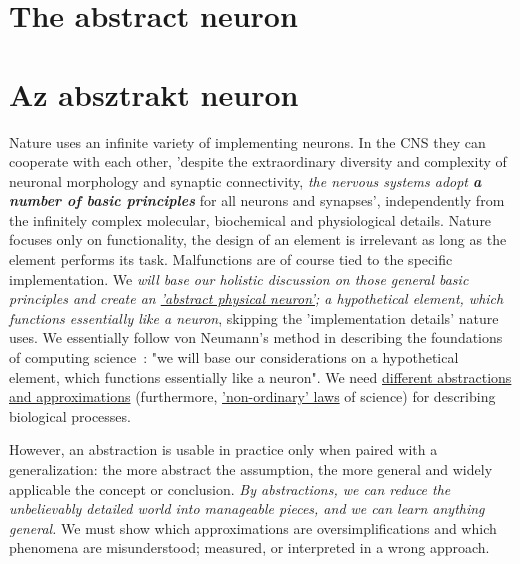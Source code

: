 
\ifx\magyar\undefined
\section[The abstract neuron]{The abstract neuron\label{sec:V2-0_AbstractNeuron}}

\else

\section[Az absztrakt neuron]{Az absztrakt neuron\label{sec:V2-0_AbstractNeuron}}
\fi


\ifx\magyar\undefined
Nature uses an infinite variety of implementing neurons. 
In the \gls{CNS} 
they can cooperate
with each other, 'despite the extraordinary diversity and complexity of neuronal morphology and synaptic connectivity,
\textit{the nervous systems adopt \textbf{a number of
 basic principles}} for all neurons and synapses',
\cite{JohnstonWuNeurophysiology:1995}
independently from the infinitely complex molecular, biochemical and physiological details.
Nature focuses only on functionality, the design of an element is irrelevant as long as the element performs its task. Malfunctions are of course tied to the specific implementation.
We \textit{will base our holistic discussion on those general basic principles 
and create an 
\hyperlink{NeuronPhysical}
{'abstract physical neuron'}; a hypothetical element, which functions
essentially like a neuron},
skipping the 'implementation details' nature uses.
We essentially follow von Neumann's method in describing the foundations of
computing science~\cite{EDVACreport1945}: "we will base our considerations on a hypothetical element, which functions essentially like a neuron".
We need \hyperlink{Abstractions}
{different abstractions and approximations} 
(furthermore, \hyperlink{NonOrdinaryLaws}{'non-ordinary' laws} of science) for describing biological processes.

However, an abstraction is usable
in practice only when paired with a generalization: the more abstract the assumption, the more general and widely applicable the concept or conclusion.
\textit{By abstractions, we can reduce the unbelievably detailed world into manageable pieces, and we can learn anything general.}
We must show which approximations are oversimplifications and which phenomena are misunderstood; measured, or interpreted in a wrong approach.

